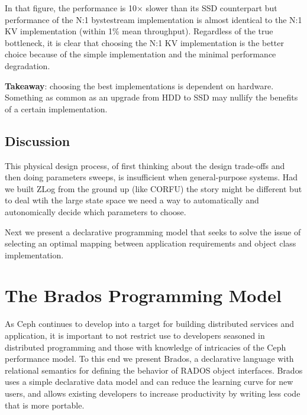 \documentclass[10pt,twocolumn]{article}
\begin{document}
In that figure, the performance is 10\(\times\) slower than its SSD counterpart
but performance of the N:1 bystestream implementation is almost identical to
the N:1 KV implementation (within 1\% mean throughput). Regardless of the true
bottleneck, it is clear that choosing the N:1 KV implementation is the better
choice because of the simple implementation and the minimal performance
degradation.

\textbf{Takeaway}: choosing the best implementations is dependent on hardware.
Something as common as an upgrade from HDD to SSD may nullify the benefits of a
certain implementation. 

\subsection{Discussion}

This physical design process, of first thinking about the design trade-offs and
then doing parameters sweeps, is insufficient when general-purpose systems. Had
we built ZLog from the ground up (like CORFU) the story might be different but
to deal wtih the large state space we need a way to automatically and
autonomically decide which parameters to choose. 

Next we present a declarative programming model that seeks to solve the issue
of selecting an optimal mapping between application requirements and object
class implementation.

\section{The Brados Programming Model}

As Ceph continues to develop into a target for building distributed services
and application, it is important to not restrict use to developers seasoned
in distributed programming and those with knowledge of intricacies of the Ceph
performance model. To this end we present Brados, a declarative language with
relational semantics for defining the behavior of RADOS object interfaces.
Brados uses a simple declarative data model and can reduce the learning curve
for new users, and allows existing developers to increase productivity by
writing less code that is more portable.
\end{document}

